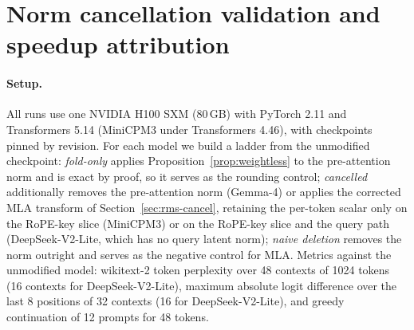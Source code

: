 \documentclass{article}
\begin{document}
\section{Norm cancellation validation and speedup attribution}\label{app:cancel}

\paragraph{Setup.} All runs use one NVIDIA H100 SXM (80\,GB) with PyTorch 2.11 and Transformers 5.14 (MiniCPM3 under Transformers 4.46), with checkpoints pinned by revision. For each model we build a ladder from the unmodified checkpoint: \emph{fold-only} applies Proposition~\ref{prop:weightless} to the pre-attention norm and is exact by proof, so it serves as the rounding control; \emph{cancelled} additionally removes the pre-attention norm (Gemma-4) or applies the corrected MLA transform of Section~\ref{sec:rms-cancel}, retaining the per-token scalar only on the RoPE-key slice (MiniCPM3) or on the RoPE-key slice and the query path (DeepSeek-V2-Lite, which has no query latent norm); \emph{naive deletion} removes the norm outright and serves as the negative control for MLA. Metrics against the unmodified model: wikitext-2 token perplexity over 48 contexts of 1024 tokens (16 contexts for DeepSeek-V2-Lite), maximum absolute logit difference over the last 8 positions of 32 contexts (16 for DeepSeek-V2-Lite), and greedy continuation of 12 prompts for 48 tokens.

\begin{table}[h!] \centering
\caption{Post-hoc norm cancellation. Token perplexity (ppl) on wikitext-2, maximum absolute logit difference $\max|\Delta|$ against the unmodified model, and the number of the 12 prompts whose 48-token greedy continuation is unchanged. For Gemma-4 the cancelled variant is the full removal of the pre-attention norm (naive deletion is the same operation); for the MLA models it is the corrected partial transform.}
\label{tab:cancel}
\footnotesize
\setlength{\tabcolsep}{4pt}
\end{table}
\end{document}
